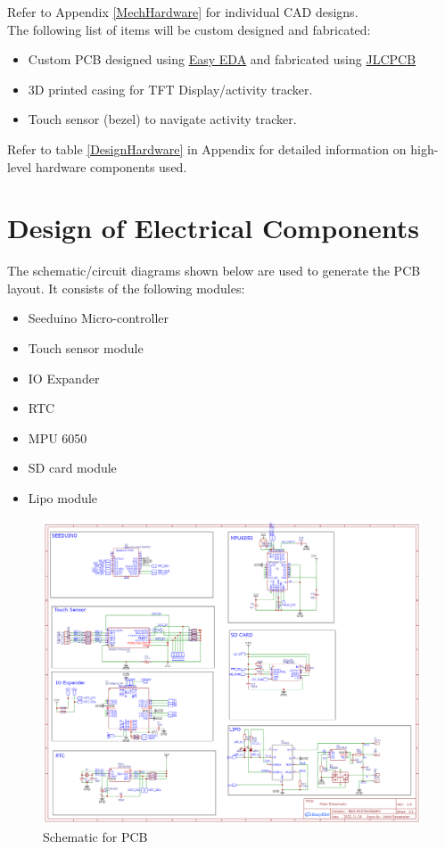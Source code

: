 \documentclass[12pt, titlepage]{article}
\begin{document}
Refer to Appendix \ref{MechHardware} for individual CAD designs.\\

The following list of items will be custom designed and fabricated:
\begin{itemize}
\item{Custom PCB designed using \href{https://easyeda.com/}{Easy EDA} and fabricated using \href{https://jlcpcb.com/}{JLCPCB}}
\item{3D printed casing for TFT Display/activity tracker.}
\item{Touch sensor (bezel) to navigate activity tracker.}
\end{itemize}

Refer to table \ref{DesignHardware} in Appendix for detailed information on high-level hardware components used.

\section{Design of Electrical Components}

The schematic/circuit diagrams shown below are used to generate the PCB layout. It consists of the following modules:
\begin{itemize}
\item Seeduino Micro-controller
\item Touch sensor module
\item IO Expander
\item RTC
\item MPU 6050
\item SD card module
\item Lipo module
\end{itemize}

\begin{figure}[H]
	\begin{center}
		 \includegraphics[width=1\textwidth]{Schematic}
		\caption{Schematic for PCB}
		\label{Schematic} 
	\end{center}
\end{figure}
\end{document}
